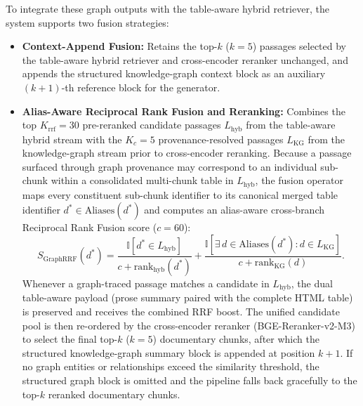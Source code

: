 \documentclass[sn-mathphys, oneside]{sn-jnl}
\begin{document}
To integrate these graph outputs with the table-aware hybrid retriever, the system supports two fusion strategies:
\begin{itemize}
\item \textbf{Context-Append Fusion:} Retains the top-$k$ ($k=5$) passages selected by the table-aware hybrid retriever and cross-encoder reranker unchanged, and appends the structured knowledge-graph context block as an auxiliary $(k+1)$-th reference block for the generator.
\item \textbf{Alias-Aware Reciprocal Rank Fusion and Reranking:} Combines the top $K_{\text{rrf}} = 30$ pre-reranked candidate passages $L_{\text{hyb}}$ from the table-aware hybrid stream with the $K_c = 5$ provenance-resolved passages $L_{\text{KG}}$ from the knowledge-graph stream prior to cross-encoder reranking. Because a passage surfaced through graph provenance may correspond to an individual sub-chunk within a consolidated multi-chunk table in $L_{\text{hyb}}$, the fusion operator maps every constituent sub-chunk identifier to its canonical merged table identifier $d^* \in \mathrm{Aliases}(d^*)$ and computes an alias-aware cross-branch Reciprocal Rank Fusion score ($c = 60$):
\[
S_{\text{GraphRRF}}(d^*) = \frac{\mathbb{I}[d^* \in L_{\text{hyb}}]}{c + \mathrm{rank}_{\text{hyb}}(d^*)} + \frac{\mathbb{I}[\exists\, d \in \mathrm{Aliases}(d^*): d \in L_{\text{KG}}]}{c + \mathrm{rank}_{\text{KG}}(d)}.
\]
Whenever a graph-traced passage matches a candidate in $L_{\text{hyb}}$, the dual table-aware payload (prose summary paired with the complete HTML table) is preserved and receives the combined RRF boost. The unified candidate pool is then re-ordered by the cross-encoder reranker (BGE-Reranker-v2-M3) to select the final top-$k$ ($k=5$) documentary chunks, after which the structured knowledge-graph summary block is appended at position $k+1$. If no graph entities or relationships exceed the similarity threshold, the structured graph block is omitted and the pipeline falls back gracefully to the top-$k$ reranked documentary chunks.
\end{itemize}
\end{document}

